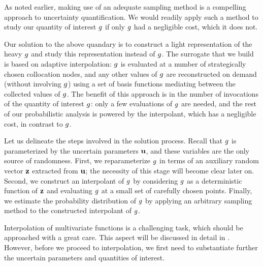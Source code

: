 As noted earlier, making use of an adequate sampling method is a compelling
approach to uncertainty quantification. We would readily apply such a method to
study our quantity of interest $g$ if only $g$ had a negligible cost, which it
does not.

Our solution to the above quandary is to construct a light representation of the
heavy $g$ and study this representation instead of $g$. The surrogate that we
build is based on adaptive interpolation: $g$ is evaluated at a number of
strategically chosen collocation nodes, and any other values of $g$ are
reconstructed on demand (without involving $g$) using a set of basis functions
mediating between the collected values of $g$. The benefit of this approach is
in the number of invocations of the quantity of interest $g$: only a few
evaluations of $g$ are needed, and the rest of our probabilistic analysis is
powered by the interpolant, which has a negligible cost, in contrast to $g$.

Let us delineate the steps involved in the solution process. Recall that $g$ is
parameterized by the uncertain parameters $\mathbf{u}$, and these variables are the
only source of randomness. First, we reparameterize $g$ in terms of an
auxiliary random vector $\mathbf{z}$ extracted from $\mathbf{u}$; the necessity of this stage
will become clear later on. Second, we construct an interpolant of $g$ by
considering $g$ as a deterministic function of $\mathbf{z}$ and evaluating $g$ at a
small set of carefully chosen points. Finally, we estimate the probability
distribution of $g$ by applying an arbitrary sampling method to the constructed
interpolant of $g$.

Interpolation of multivariate functions is a challenging task, which should be
approached with a great care. This aspect will be discussed in detail in
. However, before we proceed to interpolation, we first need
to substantiate further the uncertain parameters and quantities of interest.
